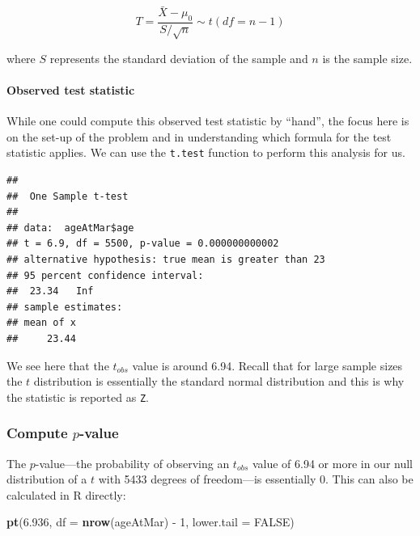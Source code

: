 \documentclass[]{tufte-book}
\newenvironment{Shaded}{\begin{snugshade}}{\end{snugshade}}
\newcommand{\KeywordTok}[1]{\textcolor[rgb]{0.13,0.29,0.53}{\textbf{{#1}}}}
\newcommand{\DataTypeTok}[1]{\textcolor[rgb]{0.13,0.29,0.53}{{#1}}}
\newcommand{\DecValTok}[1]{\textcolor[rgb]{0.00,0.00,0.81}{{#1}}}
\newcommand{\FloatTok}[1]{\textcolor[rgb]{0.00,0.00,0.81}{{#1}}}
\newcommand{\StringTok}[1]{\textcolor[rgb]{0.31,0.60,0.02}{{#1}}}
\newcommand{\OtherTok}[1]{\textcolor[rgb]{0.56,0.35,0.01}{{#1}}}
\newcommand{\NormalTok}[1]{{#1}}
\theoremstyle{definition}
\theoremstyle{definition}
\theoremstyle{remark}
\begin{document}
\[ T =\dfrac{ \bar{X} - \mu_0}{ S / \sqrt{n} } \sim t (df = n - 1) \]

where \(S\) represents the standard deviation of the sample and \(n\) is
the sample size.

\paragraph{Observed test statistic}\label{observed-test-statistic}

While one could compute this observed test statistic by ``hand'', the
focus here is on the set-up of the problem and in understanding which
formula for the test statistic applies. We can use the \texttt{t.test}
function to perform this analysis for us.

\begin{Shaded}
\end{Shaded}

\begin{verbatim}
## 
##  One Sample t-test
## 
## data:  ageAtMar$age
## t = 6.9, df = 5500, p-value = 0.000000000002
## alternative hypothesis: true mean is greater than 23
## 95 percent confidence interval:
##  23.34   Inf
## sample estimates:
## mean of x 
##     23.44
\end{verbatim}

We see here that the \(t_{obs}\) value is around 6.94. Recall that for
large sample sizes the \(t\) distribution is essentially the standard
normal distribution and this is why the statistic is reported as
\texttt{Z}.

\subsubsection{\texorpdfstring{Compute
\(p\)-value}{Compute p-value}}\label{compute-p-value}

The \(p\)-value---the probability of observing an \(t_{obs}\) value of
6.94 or more in our null distribution of a \(t\) with 5433 degrees of
freedom---is essentially 0. This can also be calculated in R directly:

\begin{Shaded}
\begin{Highlighting}[]
\KeywordTok{pt}\NormalTok{(}\FloatTok{6.936}\NormalTok{, }\DataTypeTok{df =} \KeywordTok{nrow}\NormalTok{(ageAtMar) -}\StringTok{ }\DecValTok{1}\NormalTok{, }\DataTypeTok{lower.tail =} \OtherTok{FALSE}\NormalTok{)}
\end{Highlighting}
\end{Shaded}
\end{document}
